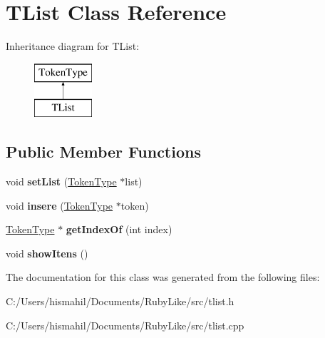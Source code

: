 \hypertarget{class_t_list}{\section{T\-List Class Reference}
\label{class_t_list}
}
Inheritance diagram for T\-List\-:\begin{figure}[H]
\begin{center}
\leavevmode
\includegraphics[height=2.000000cm]{class_t_list}
\end{center}
\end{figure}
\subsection*{Public Member Functions}
\begin{DoxyCompactItemize}
\item 
\hypertarget{class_t_list_a5264d60dba1001725d5d5f17d1482ce5}{void {\bfseries set\-List} (\hyperlink{class_token_type}{Token\-Type} $\ast$list)}\label{class_t_list_a5264d60dba1001725d5d5f17d1482ce5}

\item 
\hypertarget{class_t_list_a5a5470e91edefc47c0505579e3fecda9}{void {\bfseries insere} (\hyperlink{class_token_type}{Token\-Type} $\ast$token)}\label{class_t_list_a5a5470e91edefc47c0505579e3fecda9}

\item 
\hypertarget{class_t_list_aed59c80477b7c0c85a1f5d5a8b11bcc7}{\hyperlink{class_token_type}{Token\-Type} $\ast$ {\bfseries get\-Index\-Of} (int index)}\label{class_t_list_aed59c80477b7c0c85a1f5d5a8b11bcc7}

\item 
\hypertarget{class_t_list_a94f03c8ae61a506d8d29ca649538b209}{void {\bfseries show\-Itens} ()}\label{class_t_list_a94f03c8ae61a506d8d29ca649538b209}

\end{DoxyCompactItemize}


The documentation for this class was generated from the following files\-:\begin{DoxyCompactItemize}
\item 
C\-:/\-Users/hismahil/\-Documents/\-Ruby\-Like/src/tlist.\-h\item 
C\-:/\-Users/hismahil/\-Documents/\-Ruby\-Like/src/tlist.\-cpp\end{DoxyCompactItemize}
